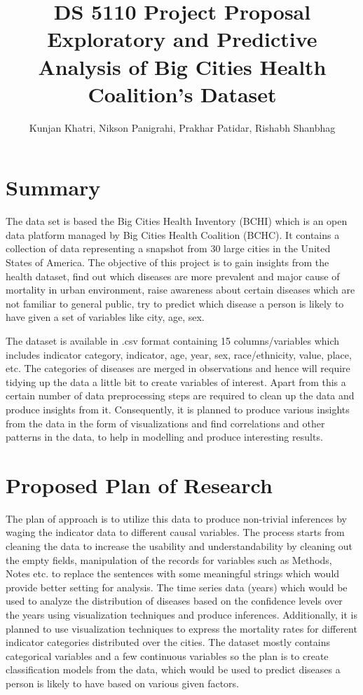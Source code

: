 \documentclass[11pt]{article}
\title{\textbf{DS 5110 Project Proposal} \\ Exploratory and Predictive Analysis of Big Cities Health Coalition’s Dataset}
\author{Kunjan Khatri, Nikson Panigrahi, Prakhar Patidar, Rishabh Shanbhag }
\date{}
\affil{Northeastern University, Boston, Massachusetts}
\begin{document}
  \maketitle
  \section{Summary}
  The data set is based the Big Cities Health Inventory (BCHI) which is an open data platform managed by Big Cities Health Coalition (BCHC). It contains a collection of data representing a snapshot from 30 large cities in the United States of America.  The objective of this project is to gain insights from the health dataset, find out which diseases are more prevalent and major cause of mortality in urban environment, raise awareness about certain diseases which are not familiar to general public, try to predict which disease a person is likely to have given a set of variables like city, age, sex. 
  
  The dataset is available in .csv format containing 15 columns/variables which includes indicator category, indicator, age, year, sex, race/ethnicity, value, place, etc. The categories of diseases are merged in observations and hence will require tidying up the data a little bit to create variables of interest. Apart from this a certain number of data preprocessing steps are required to clean up the data and produce insights from it. Consequently, it is planned to produce various insights from the data in the form of visualizations and find correlations and other patterns in the data, to help in modelling and produce interesting results. 

  \section{Proposed Plan of Research}
  The plan of approach is to utilize this data to produce non-trivial inferences by waging the indicator data to different causal variables. The process starts from cleaning the data to increase the usability and understandability by cleaning out the empty fields, manipulation of the records for variables such as Methods, Notes etc. to replace the sentences with some meaningful strings which would provide better setting for analysis. The time series data (years) which would be used to analyze the distribution of diseases based on the confidence levels over the years using visualization techniques and produce inferences.  Additionally, it is planned to use visualization techniques to express the mortality rates for different indicator categories distributed over the cities. The dataset mostly contains categorical variables and a few continuous variables so the plan is to create classification models from the data, which would be used to predict diseases a person is likely to have based on various given factors. 
\end{document}
